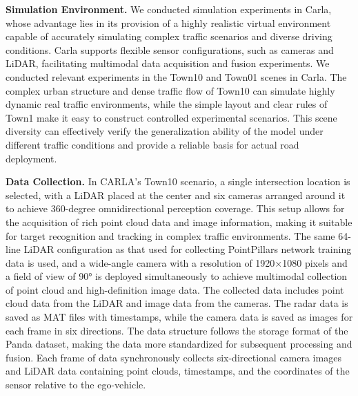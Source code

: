 \documentclass[lettersize,journal]{IEEEtran}
\begin{document}
\textbf{Simulation Environment.}
We conducted simulation experiments in Carla, whose advantage lies in its provision of a highly realistic virtual environment capable of accurately simulating complex traffic scenarios and diverse driving conditions. 
Carla supports flexible sensor configurations, such as cameras and LiDAR, facilitating multimodal data acquisition and fusion experiments\cite{Alpher22e}. 
We conducted relevant experiments in the Town10 and Town01 scenes in Carla.
The complex urban structure and dense traffic flow of Town10 can simulate highly dynamic real traffic environments, while the simple layout and clear rules of Town1 make it easy to construct controlled experimental scenarios.
This scene diversity can effectively verify the generalization ability of the model under different traffic conditions and provide a reliable basis for actual road deployment.

\textbf{Data Collection.}
In CARLA's Town10 scenario, a single intersection location is selected, with a LiDAR placed at the center and six cameras arranged around it to achieve 360-degree omnidirectional perception coverage. 
This setup allows for the acquisition of rich point cloud data and image information, making it suitable for target recognition and tracking in complex traffic environments. 
The same 64-line LiDAR configuration as that used for collecting PointPillars network training data is used, and a wide-angle camera with a resolution of 1920\(\times\)1080 pixels and a field of view of 90° is deployed simultaneously to achieve multimodal collection of point cloud and high-definition image data.
The collected data includes point cloud data from the LiDAR and image data from the cameras. 
The radar data is saved as MAT files with timestamps, while the camera data is saved as images for each frame in six directions. 
The data structure follows the storage format of the Panda dataset, making the data more standardized for subsequent processing and fusion\cite{Alpher21c}. 
Each frame of data synchronously collects six-directional camera images and LiDAR data containing point clouds, timestamps, and the coordinates of the sensor relative to the ego-vehicle.
\end{document}

